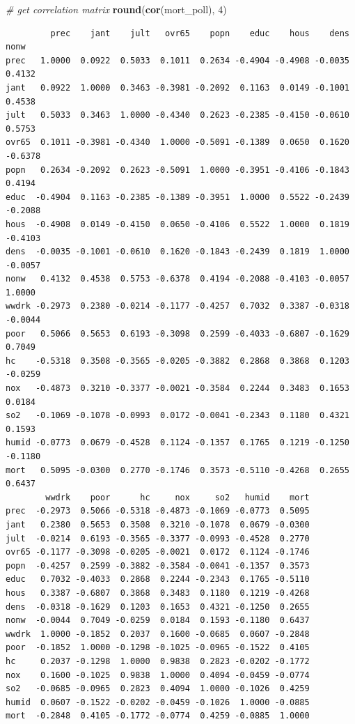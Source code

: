 \documentclass[
]{book}
\newenvironment{Shaded}{\begin{snugshade}}{\end{snugshade}}
\newcommand{\CommentTok}[1]{\textcolor[rgb]{0.56,0.35,0.01}{\textit{#1}}}
\newcommand{\DecValTok}[1]{\textcolor[rgb]{0.00,0.00,0.81}{#1}}
\newcommand{\KeywordTok}[1]{\textcolor[rgb]{0.13,0.29,0.53}{\textbf{#1}}}
\newcommand{\NormalTok}[1]{#1}
\begin{document}
\begin{Shaded}
\begin{Highlighting}[]
\CommentTok{# get correlation matrix}
\KeywordTok{round}\NormalTok{(}\KeywordTok{cor}\NormalTok{(mort_poll), }\DecValTok{4}\NormalTok{)}
\end{Highlighting}
\end{Shaded}

\begin{verbatim}
         prec    jant    jult   ovr65    popn    educ    hous    dens    nonw
prec   1.0000  0.0922  0.5033  0.1011  0.2634 -0.4904 -0.4908 -0.0035  0.4132
jant   0.0922  1.0000  0.3463 -0.3981 -0.2092  0.1163  0.0149 -0.1001  0.4538
jult   0.5033  0.3463  1.0000 -0.4340  0.2623 -0.2385 -0.4150 -0.0610  0.5753
ovr65  0.1011 -0.3981 -0.4340  1.0000 -0.5091 -0.1389  0.0650  0.1620 -0.6378
popn   0.2634 -0.2092  0.2623 -0.5091  1.0000 -0.3951 -0.4106 -0.1843  0.4194
educ  -0.4904  0.1163 -0.2385 -0.1389 -0.3951  1.0000  0.5522 -0.2439 -0.2088
hous  -0.4908  0.0149 -0.4150  0.0650 -0.4106  0.5522  1.0000  0.1819 -0.4103
dens  -0.0035 -0.1001 -0.0610  0.1620 -0.1843 -0.2439  0.1819  1.0000 -0.0057
nonw   0.4132  0.4538  0.5753 -0.6378  0.4194 -0.2088 -0.4103 -0.0057  1.0000
wwdrk -0.2973  0.2380 -0.0214 -0.1177 -0.4257  0.7032  0.3387 -0.0318 -0.0044
poor   0.5066  0.5653  0.6193 -0.3098  0.2599 -0.4033 -0.6807 -0.1629  0.7049
hc    -0.5318  0.3508 -0.3565 -0.0205 -0.3882  0.2868  0.3868  0.1203 -0.0259
nox   -0.4873  0.3210 -0.3377 -0.0021 -0.3584  0.2244  0.3483  0.1653  0.0184
so2   -0.1069 -0.1078 -0.0993  0.0172 -0.0041 -0.2343  0.1180  0.4321  0.1593
humid -0.0773  0.0679 -0.4528  0.1124 -0.1357  0.1765  0.1219 -0.1250 -0.1180
mort   0.5095 -0.0300  0.2770 -0.1746  0.3573 -0.5110 -0.4268  0.2655  0.6437
        wwdrk    poor      hc     nox     so2   humid    mort
prec  -0.2973  0.5066 -0.5318 -0.4873 -0.1069 -0.0773  0.5095
jant   0.2380  0.5653  0.3508  0.3210 -0.1078  0.0679 -0.0300
jult  -0.0214  0.6193 -0.3565 -0.3377 -0.0993 -0.4528  0.2770
ovr65 -0.1177 -0.3098 -0.0205 -0.0021  0.0172  0.1124 -0.1746
popn  -0.4257  0.2599 -0.3882 -0.3584 -0.0041 -0.1357  0.3573
educ   0.7032 -0.4033  0.2868  0.2244 -0.2343  0.1765 -0.5110
hous   0.3387 -0.6807  0.3868  0.3483  0.1180  0.1219 -0.4268
dens  -0.0318 -0.1629  0.1203  0.1653  0.4321 -0.1250  0.2655
nonw  -0.0044  0.7049 -0.0259  0.0184  0.1593 -0.1180  0.6437
wwdrk  1.0000 -0.1852  0.2037  0.1600 -0.0685  0.0607 -0.2848
poor  -0.1852  1.0000 -0.1298 -0.1025 -0.0965 -0.1522  0.4105
hc     0.2037 -0.1298  1.0000  0.9838  0.2823 -0.0202 -0.1772
nox    0.1600 -0.1025  0.9838  1.0000  0.4094 -0.0459 -0.0774
so2   -0.0685 -0.0965  0.2823  0.4094  1.0000 -0.1026  0.4259
humid  0.0607 -0.1522 -0.0202 -0.0459 -0.1026  1.0000 -0.0885
mort  -0.2848  0.4105 -0.1772 -0.0774  0.4259 -0.0885  1.0000
\end{verbatim}
\end{document}
